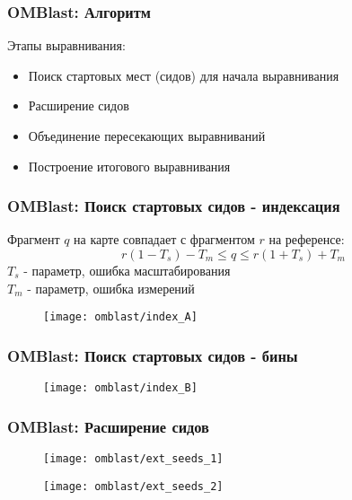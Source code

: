 

\begin{frame}
\frametitle{OMBlast\nocite{omblast}: Алгоритм}

Этапы выравнивания:
\begin{itemize}
  \item Поиск стартовых мест (сидов) для начала выравнивания
  \item Расширение сидов
  \item Объединение пересекающих выравниваний
  \item Построение итогового выравнивания
\end{itemize}

\end{frame}

\begin{frame}
\frametitle{OMBlast: Поиск стартовых сидов - индексация}
  Фрагмент $q$ на карте совпадает с фрагментом $r$ на референсе:
  \begin{equation*}
    r(1 - T_s) - T_m \le q \le r(1 + T_s) + T_m
  \end{equation*}
  $T_s$ - параметр, ошибка масштабирования \\
  $T_m$ - параметр, ошибка измерений \\
  \begin{figure}
    \centering
    \texttt{[image: omblast/index\_A]}
  \end{figure}
\end{frame}

\begin{frame}
\frametitle{OMBlast: Поиск стартовых сидов - бины}
  \begin{figure}
    \centering
    \texttt{[image: omblast/index\_B]}
  \end{figure}
\end{frame}

\begin{frame}
\frametitle{OMBlast: Расширение сидов}
  \begin{figure}
    \centering
    \texttt{[image: omblast/ext\_seeds\_1]}
  \end{figure}
  \begin{figure}
    \centering
    \texttt{[image: omblast/ext\_seeds\_2]}
  \end{figure}
\end{frame}

